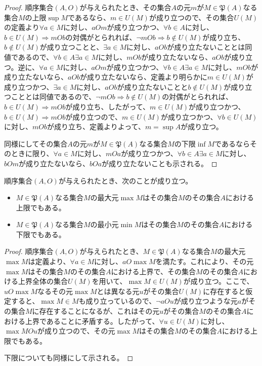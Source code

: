 \documentclass[dvipdfmx]{jsarticle}
\begin{document}
\begin{proof}
順序集合$(A,O)$が与えられたとき、その集合$A$の元$m$が$M \in \mathfrak{P}(A)$なる集合$M$の上限$\sup M$であるなら、$m \in U(M)$が成り立つので、その集合$U(M)$の定義より$\forall a \in M$に対し、$aOm$が成り立つかつ、$\forall b \in A$に対し、$b \in U(M) \Rightarrow mOb$の対偶がとられれば、$\neg mOb \Rightarrow b \notin U(M)$が成り立ち、$b \notin U(M)$が成り立つことと、$\exists a \in M$に対し、$aOb$が成り立たないこととは同値であるので、$\forall b \in A\exists a \in M$に対し、$mOb$が成り立たないなら、$aOb$が成り立つ。逆に、$\forall a \in M$に対し、$aOm$が成り立つかつ、$\forall b \in A\exists a \in M$に対し、$mOb$が成り立たないなら、$aOb$が成り立たないなら、定義より明らかに$m \in U(M)$が成り立つかつ、$\exists a \in M$に対し、$aOb$が成り立たないことと$b \notin U(M)$が成り立つこととは同値であるので、$\neg mOb \Rightarrow b \notin U(M)$の対偶がとられれば、$b \in U(M) \Rightarrow mOb$が成り立ち、したがって、$m \in U(M)$が成り立つかつ、$b \in U(M) \Rightarrow mOb$が成り立つので、$m \in U(M)$が成り立つかつ、$\forall b \in U(M)$に対し、$mOb$が成り立ち、定義よりよって、$m = \sup A$が成り立つ。\par
同様にしてその集合$A$の元$m$が$M \in \mathfrak{P}(A)$なる集合$M$の下限$\inf M$であるならそのときに限り、$\forall a \in M$に対し、$mOa$が成り立つかつ、$\forall b \in A\exists a \in M$に対し、$bOm$が成り立たないなら、$bOa$が成り立たないことも示される。
\end{proof}
\begin{thm}\label{1.3.1.10}
順序集合$(A,O)$が与えられたとき、次のことが成り立つ。
\begin{itemize}
\item
  $M \in \mathfrak{P}(A)$なる集合$M$の最大元$\max M$はその集合$M$のその集合$A$における上限でもある。
\item
  $M \in \mathfrak{P}(A)$なる集合$M$の最小元$\min M$はその集合$M$のその集合$A$における下限でもある。
\end{itemize}
\end{thm}
\begin{proof}
順序集合$(A,O)$が与えられたとき、$M \in \mathfrak{P}(A)$なる集合$M$の最大元$\max M$は定義より、$\forall a \in M$に対し、$aO\max M$を満たす。これにより、その元$\max M$はその集合$M$のその集合$A$における上界で、その集合$M$のその集合$A$における上界全体の集合$U(M)$を用いて、$\max M \in U(M)$が成り立つ。ここで、$uO\max M$なるその元$\max M$とは異なる元$u$がその集合$U(M)$に存在すると仮定すると、$\max M \in M$も成り立っているので、$\neg aOu$が成り立つような元$a$がその集合$M$に存在することになるが、これはその元$u$がその集合$M$のその集合$A$における上界であることに矛盾する。したがって、$\forall u \in U(M)$に対し、$\max MOu$が成り立つので、その元$\max M$はその集合$M$のその集合$A$における上限でもある。\par
下限についても同様にして示される。
\end{proof}
\end{document}
